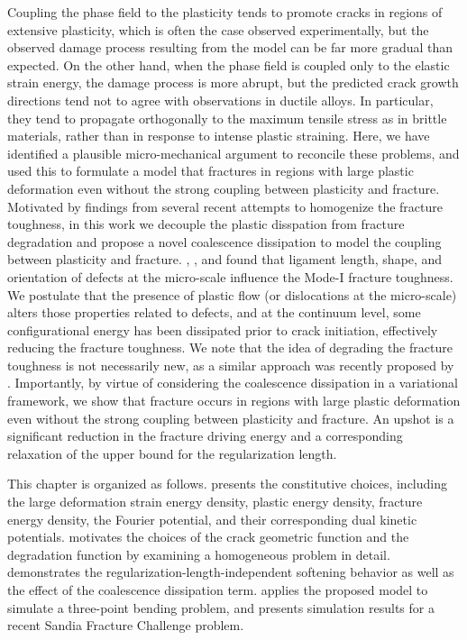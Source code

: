 Coupling the phase field to the plasticity tends to promote cracks in regions of extensive plasticity, which is often the case observed experimentally, but the observed damage process resulting from the model can be far more gradual than expected. On the other hand, when the phase field is coupled only to the elastic strain energy, the damage process is more abrupt, but the predicted crack growth directions tend not to agree with observations in ductile alloys.  In particular, they tend to propagate orthogonally to the maximum tensile stress as in brittle materials, rather than in response to intense plastic straining. Here, we have identified a plausible micro-mechanical argument to reconcile these problems, and used this to formulate a model that fractures in regions with large plastic deformation even without the strong coupling between plasticity and fracture. Motivated by findings from several recent attempts to homogenize the fracture toughness, in this work we decouple the plastic disspation from fracture degradation and propose a novel coalescence dissipation to model the coupling between plasticity and fracture. \citet{rodriguez2016silica}, \citet{chowdhury2019effects}, and \citet{vo2020molecular} found that ligament length, shape, and orientation of defects at the micro-scale influence the Mode-I fracture toughness. We postulate that the presence of plastic flow (or dislocations at the micro-scale) alters those properties related to defects, and at the continuum level, some configurational energy has been dissipated prior to crack initiation, effectively reducing the fracture toughness. We note that the idea of degrading the fracture toughness is not necessarily new, as a similar approach was recently proposed by \citet{yin2020ductile}. Importantly, by virtue of considering the coalescence dissipation in a variational framework, we show that fracture occurs in regions with large plastic deformation even without the strong coupling between plasticity and fracture.  An upshot is a significant reduction in the fracture driving energy and a corresponding relaxation of the upper bound for the regularization length.


This chapter is organized as follows.  presents the constitutive choices, including the large deformation strain energy density, plastic energy density, fracture energy density, the Fourier potential, and their corresponding dual kinetic potentials.
 motivates the choices of the crack geometric function and the degradation function by examining a homogeneous problem in detail.  demonstrates the regularization-length-independent softening behavior as well as the effect of the coalescence dissipation term.
 applies the proposed model to simulate a three-point bending problem, and  presents simulation results for a recent Sandia Fracture Challenge problem.
